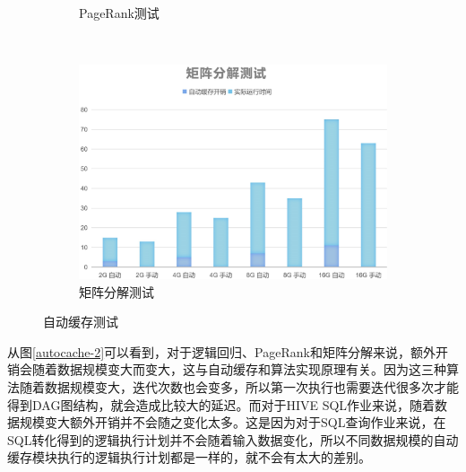 \begin{figure}[!htbp]
\begin{subfigure}[b]{0.45\linewidth}
      \caption{PageRank测试}
      \label{fig:pagerank-auto-cache}
    \end{subfigure}%
    ~%
    \begin{subfigure}[b]{0.45\linewidth}
      \includegraphics[width=\textwidth]{Img/matrix-auto-cahe.jpg}
      \caption{矩阵分解测试}
      \label{fig:matrix-auto-cache}
    \end{subfigure}
    \caption{自动缓存测试}
    \label{fig:auto-cache}
\end{figure}

从图\ref{autocache-2}可以看到，对于逻辑回归、PageRank和矩阵分解来说，额外开销会随着数据规模变大而变大，这与自动缓存和算法实现原理有关。因为这三种算法随着数据规模变大，迭代次数也会变多，所以第一次执行也需要迭代很多次才能得到DAG图结构，就会造成比较大的延迟。而对于HIVE SQL作业来说，随着数据规模变大额外开销并不会随之变化太多。这是因为对于SQL查询作业来说，在SQL转化得到的逻辑执行计划并不会随着输入数据变化，所以不同数据规模的自动缓存模块执行的逻辑执行计划都是一样的，就不会有太大的差别。

